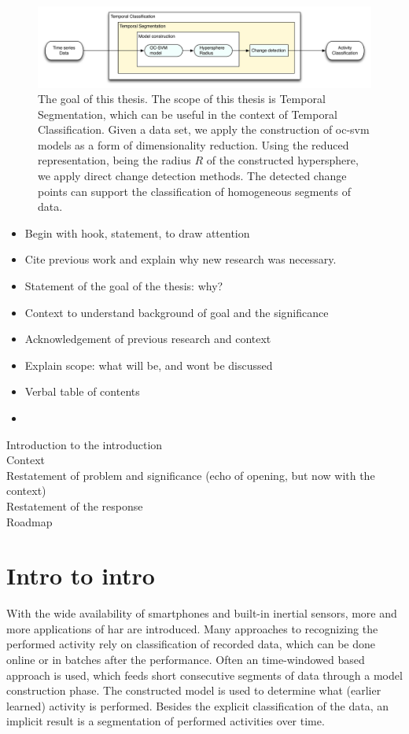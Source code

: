 \begin{figure}
  \centering
    \includegraphics[width=\textwidth,height=\textheight,keepaspectratio]{./Figures/chapter1/thesis_goal.pdf}
  \caption[Thesis goal]{The goal of this thesis. The scope of this thesis is Temporal Segmentation, which can be useful in the context of Temporal Classification. Given a data set, we apply the construction of \gls{oc-svm} models as a form of dimensionality reduction. Using the reduced representation, being the radius $R$ of the constructed hypersphere, we apply direct change detection methods. The detected change points can support the classification of homogeneous segments of data.}
  \label{fig:thesis_goal}
\end{figure}


\begin{itemize}
  \item Begin with hook, statement, to draw attention
  \item Cite previous work and explain why new research was necessary.
  \item Statement of the goal of the thesis: why?
  \item Context to understand background of goal and the significance
  \item Acknowledgement of previous research and context
  \item Explain scope: what will be, and wont be discussed
  \item Verbal table of contents
  \item
\end{itemize}

Introduction to the introduction \\
Context \\
Restatement of problem and significance (echo of opening, but now with the context) \\
Restatement of the response \\
Roadmap \\

\section{Intro to intro}
With the wide availability of smartphones and built-in inertial sensors, more and more applications of \gls{har} are introduced.
Many approaches to recognizing the performed activity rely on classification of recorded data, which can be done online or in batches after the performance.
Often an time-windowed based approach is used, which feeds short consecutive segments of data through a model construction phase.
The constructed model is used to determine what (earlier learned) activity is performed.
Besides the explicit classification of the data, an implicit result is a segmentation of performed activities over time.

